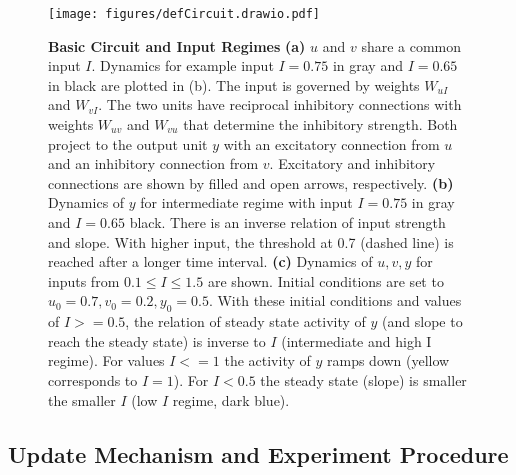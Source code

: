 \documentclass[9pt]{article}
\begin{document}
\begin{figure}[ht]
	\centering
	\texttt{[image: figures/defCircuit.drawio.pdf]}
	\caption{\textbf{Basic Circuit and Input Regimes} 
	\textbf{(a)} $u$ and $v$ share a common input $I$. Dynamics for example input $I=0.75$ in gray and $I=0.65$ in black are plotted in (b). The input is governed by weights $W_{uI}$ and $W_{vI}$. The two units have reciprocal inhibitory connections with weights $W_{uv}$ and $W_{vu}$ that determine the inhibitory strength. Both project to the output unit $y$ with an excitatory connection from $u$ and an inhibitory connection from $v$. Excitatory and inhibitory connections are shown by filled and open arrows, respectively. 
	\textbf{(b)} Dynamics of $y$ for intermediate regime with input $I=0.75$ in gray and $I=0.65$ black. There is an inverse relation of input strength and slope. With higher input, the threshold at 0.7 (dashed line) is reached after a longer time interval. 
	\textbf{(c)} Dynamics of $u, v, y$ for inputs from $0.1\leq I \leq 1.5$ are shown. Initial conditions are set to $u_0=0.7 , v_0=0.2 , y_0=0.5$. With these initial conditions and values of $I>=0.5$, the relation of steady state activity of $y$ (and slope to reach the steady state) is inverse to $I$ (intermediate and high I regime). For values $I<=1$ the activity of $y$ ramps down (yellow corresponds to $I=1$). For $I<0.5$ the steady state (slope) is smaller the smaller $I$ (low $I$ regime, dark blue).}
\label{fig:circuit}
\end{figure}


\subsection{Update Mechanism and Experiment Procedure}
\end{document}
